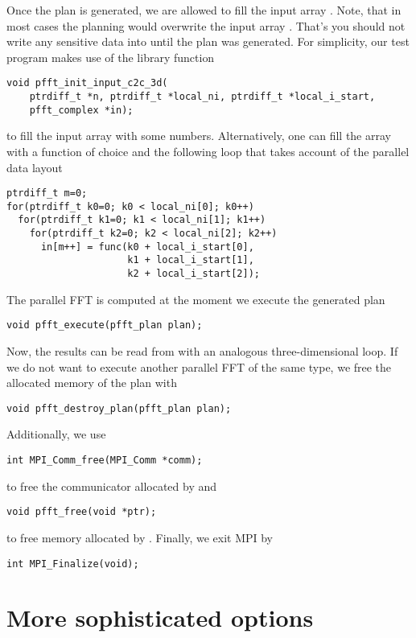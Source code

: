 Once the plan is generated, we are allowed to fill the input array . Note, that in most cases
the planning  would overwrite the input array . That's you should not
write any sensitive data into  until the plan was generated.
For simplicity, our test program makes use of the library function
\begin{lstlisting}
void pfft_init_input_c2c_3d(
    ptrdiff_t *n, ptrdiff_t *local_ni, ptrdiff_t *local_i_start,
    pfft_complex *in);
\end{lstlisting}
to fill the input array with some numbers. Alternatively, one can fill the array with a function  of choice
and the following loop that takes account of the parallel data layout
\begin{lstlisting}
ptrdiff_t m=0;
for(ptrdiff_t k0=0; k0 < local_ni[0]; k0++)
  for(ptrdiff_t k1=0; k1 < local_ni[1]; k1++)
    for(ptrdiff_t k2=0; k2 < local_ni[2]; k2++)
      in[m++] = func(k0 + local_i_start[0],
                     k1 + local_i_start[1],
                     k2 + local_i_start[2]);
\end{lstlisting}
The parallel FFT is computed at the moment we execute the generated plan
\begin{lstlisting}
void pfft_execute(pfft_plan plan);
\end{lstlisting}
Now, the results can be read from  with an analogous three-dimensional loop.
If we do not want to execute another parallel FFT of the same type, we free the allocated memory of the plan with
\begin{lstlisting}
void pfft_destroy_plan(pfft_plan plan);
\end{lstlisting}
Additionally, we use
\begin{lstlisting}
int MPI_Comm_free(MPI_Comm *comm);  
\end{lstlisting}
to free the communicator allocated by  and
\begin{lstlisting}
void pfft_free(void *ptr);
\end{lstlisting}
to free memory allocated by .
Finally, we exit MPI by
\begin{lstlisting}
int MPI_Finalize(void);
\end{lstlisting}

\section{More sophisticated options}

